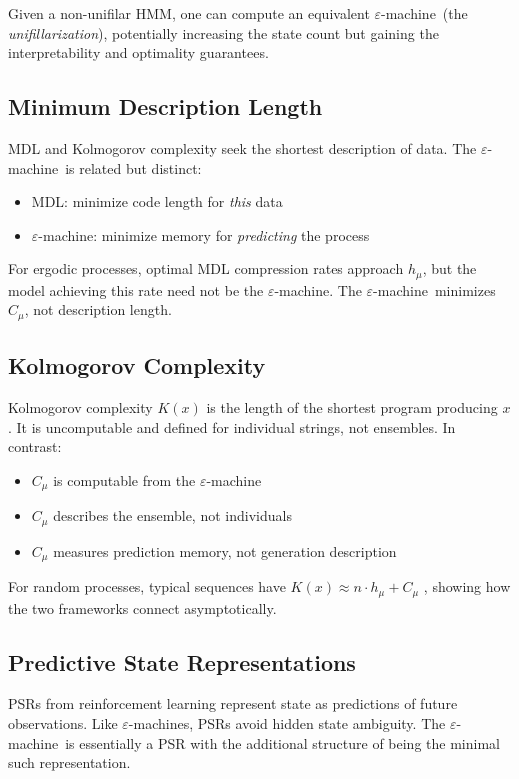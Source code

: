 \documentclass[11pt,twocolumn]{article}
\theoremstyle{plain}
\theoremstyle{definition}
\theoremstyle{remark}
\newcommand{\eps}{\varepsilon}
\newcommand{\eM}{$\eps$-machine}
\newcommand{\Cmu}{C_\mu}
\newcommand{\hmu}{h_\mu}
\begin{document}
Given a non-unifilar HMM, one can compute an equivalent \eM\ (the \emph{unifillarization}), potentially increasing the state count but gaining the interpretability and optimality guarantees.

\subsection{Minimum Description Length}

MDL \cite{rissanen1978modeling} and Kolmogorov complexity seek the shortest description of data. The \eM\ is related but distinct:
\begin{itemize}[nosep]
    \item MDL: minimize code length for \emph{this} data
    \item \eM: minimize memory for \emph{predicting} the process
\end{itemize}

For ergodic processes, optimal MDL compression rates approach $\hmu$, but the model achieving this rate need not be the \eM. The \eM\ minimizes $\Cmu$, not description length.

\subsection{Kolmogorov Complexity}

Kolmogorov complexity $K(x)$ is the length of the shortest program producing $x$. It is uncomputable and defined for individual strings, not ensembles. In contrast:
\begin{itemize}[nosep]
    \item $\Cmu$ is computable from the \eM
    \item $\Cmu$ describes the ensemble, not individuals
    \item $\Cmu$ measures prediction memory, not generation description
\end{itemize}

For random processes, typical sequences have $K(x) \approx n \cdot \hmu + \Cmu$ \cite{crutchfield1994calculi}, showing how the two frameworks connect asymptotically.

\subsection{Predictive State Representations}

PSRs \cite{boots2011closing} from reinforcement learning represent state as predictions of future observations. Like \eM s, PSRs avoid hidden state ambiguity. The \eM\ is essentially a PSR with the additional structure of being the minimal such representation.
\end{document}
